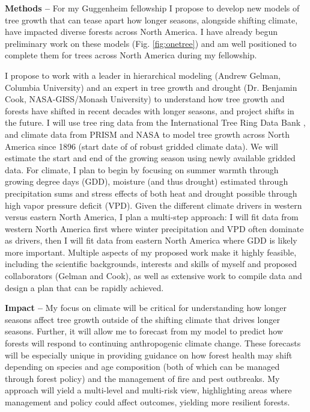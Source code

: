 \documentclass[11pt,letter,oneside]{article}
\begin{document}
{\bf Methods --} For my Guggenheim fellowship I propose to develop new models of tree growth that can tease apart how longer seasons, alongside shifting climate, have impacted diverse forests across North America. I have already begun preliminary work on these models (Fig. \ref{fig:onetree}) and am well positioned to complete them for trees across North America during my fellowship. 

I propose to work with a leader in hierarchical modeling (Andrew Gelman, Columbia University)\cite{BDA} and an expert in tree growth and drought (Dr. Benjamin Cook, NASA-GISS/Monash University) to understand how tree growth and forests have shifted in recent decades with longer seasons, and project shifts in the future. I will use tree ring data from the International Tree Ring Data Bank \cite{zhao2019international}, and climate data from PRISM and NASA to model tree growth across North America since 1896 (start date of of robust gridded climate data). We will estimate the start and end of the growing season using newly available gridded data.\cite{nelson2024x} For climate, I plan to begin by focusing on summer warmth through growing degree days (GDD), moisture (and thus drought) estimated through precipitation sums and stress effects of both heat and drought possible through high vapor pressure deficit (VPD). Given the different climate drivers in western versus eastern North America, I plan a multi-step approach: I will fit data from western North America first where winter precipitation and VPD often dominate as drivers, then I will fit data from eastern North America where GDD is likely more important. Multiple aspects of my proposed work make it highly feasible, including the scientific backgrounds, interests and skills of myself and proposed collaborators (Gelman and Cook), as well as extensive work to compile data and design a plan that can be rapidly achieved.

{\bf Impact --} My focus on climate will be critical for understanding how longer seasons affect tree growth outside of the shifting climate that drives longer seasons. Further, it will allow me to forecast from my model to predict how forests will respond to continuing anthropogenic climate change. These forecasts will be especially unique in providing guidance on how forest health may shift depending on species and age composition (both of which can be managed through forest policy) and the management of fire and pest outbreaks. My approach will yield a multi-level and multi-risk view, highlighting areas where management and policy could affect outcomes, yielding more resilient forests.
\end{document}
